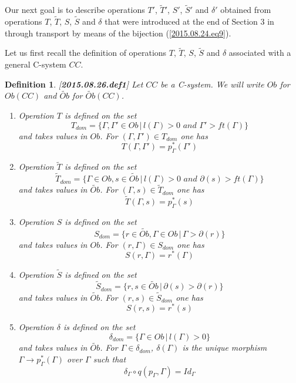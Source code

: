 \documentclass[11pt]{article}
\newtheorem{definition}[proposition]{Definition}
\newcommand{\llabel}[1]{\label{#1}[{\bf #1}]}
\newcommand{\sr}{\rightarrow}
\newcommand{\wt}{\widetilde}
\begin{document}
Our next goal is to describe operations $T'$, $\wt{T}'$, $S'$, $\wt{S}'$ and $\delta'$ obtained from operations $T$, $\wt{T}$, $S$, $\wt{S}$ and $\delta$ that were introduced at the end of Section 3 in \cite{Csubsystems} through transport by means of the bijection (\ref{2015.08.24.eq9}).

Let us first recall the definition of operations $T$, $\wt{T}$, $S$, $\wt{S}$ and $\delta$ associated with a general C-system $CC$. 
%
\begin{definition}
\llabel{2015.08.26.def1}
Let $CC$ be a C-system. We will write $Ob$ for $Ob(CC)$ and $\wt{Ob}$ for $\wt{Ob}(CC)$. 
%
%
\begin{enumerate}
\item Operation $T$ is defined on the set
%
$$T_{dom}=\{\Gamma,\Gamma'\in Ob\,|\,l(\Gamma)>0\,\,and\,\, \Gamma'>ft(\Gamma)\}$$
%
and takes values in $Ob$. For $(\Gamma,\Gamma')\in T_{dom}$ one has
%
$$T(\Gamma,\Gamma')=p_{\Gamma}^*(\Gamma')$$
%
\item Operation $\wt{T}$ is defined on the set
%
$$\wt{T}_{dom}=\{\Gamma\in Ob, s\in \wt{Ob}\,|\,l(\Gamma)>0\,\,and\,\, \partial(s)>ft(\Gamma)\}$$
%
and takes values in $\wt{Ob}$. For $(\Gamma,s)\in \wt{T}_{dom}$ one has
%
$$\wt{T}(\Gamma,s)=p_{\Gamma}^*(s)$$
%
\item Operation $S$ is defined on the set
%
$$S_{dom}=\{r\in \wt{Ob}, \Gamma\in Ob\,|\,\Gamma>\partial(r)\}$$
%
and takes values in $Ob$. For $(r,\Gamma)\in S_{dom}$ one has
%
$$S(r,\Gamma)=r^*(\Gamma)$$
%
\item Operation $\wt{S}$ is defined on the set 
%
$$\wt{S}_{dom}=\{r,s\in \wt{Ob}\,|\,\partial(s)>\partial(r)\}$$
%
and takes values in $\wt{Ob}$. For $(r,s)\in \wt{S}_{dom}$ one has
%
$$S(r,s)=r^*(s)$$
%
\item Operation $\delta$ is defined on the set 
%
$$\delta_{dom}=\{\Gamma\in Ob\,|\,l(\Gamma)>0\}$$
%
and takes values in $\wt{Ob}$. For $\Gamma\in \delta_{dom}$, $\delta(\Gamma)$ is the unique morphism $\Gamma\sr p_{\Gamma}^*(\Gamma)$ over $\Gamma$ such that 
%
$$\delta_{\Gamma}\circ q(p_{\Gamma},\Gamma)=Id_{\Gamma}$$
%
\end{enumerate}
\end{definition}
%
\end{document}
